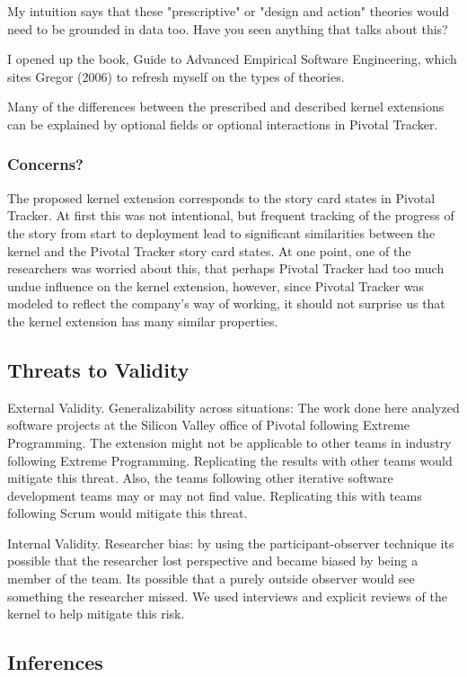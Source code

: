 \documentclass[preprint,12pt,3p]{elsarticle}
\begin{document}
{My intuition says that these "prescriptive" or "design and action" theories would need to be grounded in data too. Have you seen anything that talks about this?

I opened up the book, Guide to Advanced Empirical Software Engineering,  which sites Gregor (2006) to refresh myself on the types of theories.

Many of the differences between the prescribed and described kernel extensions can be explained by optional fields or optional interactions in Pivotal Tracker.


\subsubsection{Concerns?}
The proposed kernel extension corresponds to the story card states in Pivotal Tracker. At first this was not intentional, but frequent tracking of the progress of the story from start to deployment lead to significant similarities between the kernel and the Pivotal Tracker story card states. At one point, one of the researchers was worried about this, that perhaps Pivotal Tracker had too much undue influence on the kernel extension, however, since Pivotal Tracker was modeled to reflect the company's way of working, it should not surprise us that the kernel extension has many similar properties. 

\subsection{Threats to Validity}

External Validity. Generalizability across situations: The work done here analyzed software projects at the Silicon Valley office of Pivotal following Extreme Programming. The extension might not be applicable to other teams in industry following Extreme Programming. Replicating the results with other teams would mitigate this threat. Also, the teams following other iterative software development teams may or may not find value. Replicating this with teams following Scrum would mitigate this threat.

Internal Validity. Researcher bias: by using the participant-observer technique its possible that the researcher lost perspective and became biased by being a member of the team. Its possible that a purely outside observer would see something the researcher missed. We used interviews and explicit reviews of the kernel to help mitigate this risk.

\subsection{Inferences}

}
\end{document}
